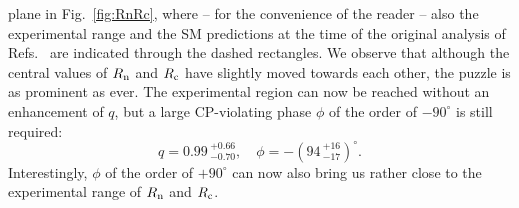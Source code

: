 \documentclass[12pt]{article}
\begin{document}
plane in Fig.~\ref{fig:RnRc}, where -- for the convenience of the reader --
also the experimental range and the SM predictions at the time of the 
original analysis of Refs.~\cite{BFRS2,BFRS3} are indicated through the dashed 
rectangles. 
We observe that although
the central values of $R_{\rm n}$ and $R_{\rm c}$ have slightly moved towards
each other, the puzzle is as prominent as ever. The experimental
region can now be reached without an enhancement of $q$, but
a large CP-violating phase $\phi$ of the order of $-90^\circ$ is
still required:
\begin{equation}
\label{q-phi}
q=0.99\,^{+0.66}_{-0.70} ,\quad \phi=-(94\,^{+16}_{-17} )^\circ.
\end{equation}
Interestingly, $\phi$ of the order of $+90^\circ$ can now also bring us rather 
close to the experimental range of $R_{\rm n}$ and $R_{\rm c}$. 
\end{document}
